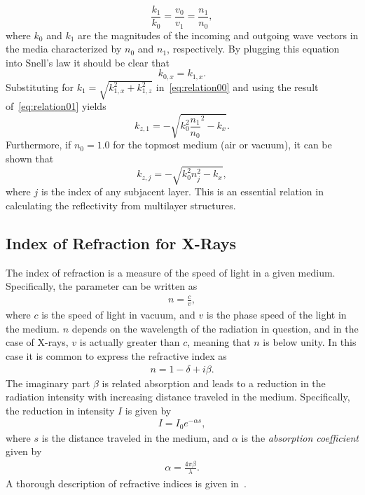 \documentclass[10pt,twoside, b5paper,pdftex]{report}
\begin{document}
\begin{equation}
\frac{k_{1}}{k_{0}} = \frac{v_{0}}{v_{1}} = \frac{n_{1}}{n_{0}}, 
\label{eq:relation00}
\end{equation}  
%
where $k_{0}$ and $k_{1}$ are the magnitudes of the incoming and outgoing wave vectors in the media characterized by $n_{0}$ and $n_{1}$, respectively. By plugging this equation into Snell's law it should be clear that
%
\begin{equation}
k_{0,x} = k_{1,x} .
\label{eq:relation01}
\end{equation}
%
Substituting for $k_{1} = \sqrt{k_{1,x}^{2} + k_{1,z}^{2}}$ in~\cref{eq:relation00} and using the result of~\cref{eq:relation01} yields  
%
\begin{equation}\label{eq:snell_descartes_0}
k_{z,1} = - \sqrt{k_{0}^{2}\frac{n_{1}}{n_{0}}^{2} - k_{x}} .
\end{equation}
%
Furthermore, if $n_{0} = 1.0$ for the topmost medium (air or vacuum), it can be shown that 
%
\begin{equation}\label{eq:snell_descartes}
k_{z,j} = - \sqrt{k_{0}^{2}n_{j}^{2} - k_{x}},
\end{equation}
%
where $j$ is the index of any subjacent layer. This is an essential relation  in calculating the reflectivity from multilayer structures.

\subsection{Index of Refraction for X-Rays \label{sec:ndb}}
The index of refraction is a measure of the speed of light in a given medium. Specifically, the parameter can be written as
\begin{align}
	n = \frac{c}{v},
\end{align}
where $c$ is the speed of light in vacuum, and $v$ is the phase speed of the light in the medium. $n$ depends on the wavelength of the radiation in question, and in the case of X-rays, $v$ is actually greater than $c$, meaning that $n$ is below unity. In this case it is common to express the refractive index as 
\begin{align}
	n = 1 - \delta + i\beta .
\end{align}
The imaginary part $\beta$ is related absorption and
leads to a reduction in the radiation intensity with increasing distance traveled in the medium. Specifically, the reduction in intensity $I$ is given by
\begin{align}
	I = I_0e^{-\alpha s},
\end{align}
where $s$ is the distance traveled in the medium, and $\alpha$ is the {\it absorption coefficient} given by
\begin{align}
	\alpha = \frac{4\pi \beta}{\lambda} .
\end{align}
A thorough description of refractive indices is given in~\cite{PEDROTTI}. 
\end{document}
